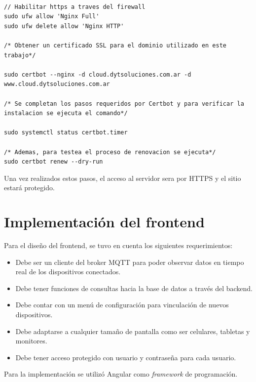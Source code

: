 \begin{lstlisting}[label=cod:certificados-ssl,caption=Procedimiento realizado para instalar certificados SSL en Nginx.] 

// Habilitar https a traves del firewall
sudo ufw allow 'Nginx Full'
sudo ufw delete allow 'Nginx HTTP'

/* Obtener un certificado SSL para el dominio utilizado en este trabajo*/

sudo certbot --nginx -d cloud.dytsoluciones.com.ar -d www.cloud.dytsoluciones.com.ar

/* Se completan los pasos requeridos por Certbot y para verificar la instalacion se ejecuta el comando*/

sudo systemctl status certbot.timer

/* Ademas, para testea el proceso de renovacion se ejecuta*/
sudo certbot renew --dry-run

\end{lstlisting} 

Una vez realizados estos pasos, el acceso al servidor sera por HTTPS y el sitio estará protegido.

\section{Implementación del frontend}

Para el diseño del frontend, se tuvo en cuenta los siguientes requerimientos:

\begin{itemize}
	\item Debe ser un cliente del broker MQTT para poder observar datos en tiempo real de los dispositivos conectados.
	
	\item Debe tener funciones de consultas hacia la base de datos a través del backend. 
	
	\item Debe contar con un menú de configuración para vinculación de nuevos dispositivos. 
	
	\item Debe adaptarse a cualquier tamaño de pantalla como ser celulares, tabletas y monitores.
	
	\item Debe tener acceso protegido con usuario y contraseña para cada usuario. 

\end{itemize}


Para la implementación se utilizó Angular como \textit{framework} de programación.


